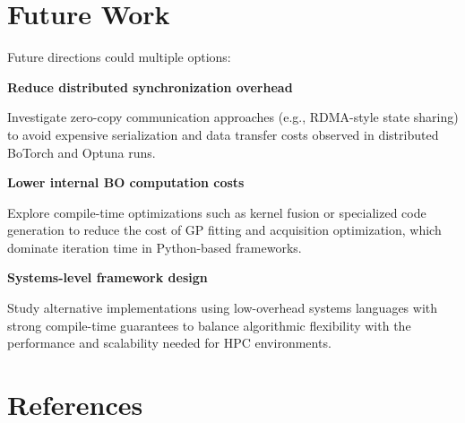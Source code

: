 \documentclass[11pt]{article}
\begin{document}
\section{Future Work}
Future directions could multiple options:


    \item \textbf{Reduce distributed synchronization overhead}

 Investigate zero-copy communication approaches (e.g., RDMA-style state sharing) to avoid expensive serialization and data transfer costs observed in distributed BoTorch and Optuna runs.
    \item \textbf{Lower internal BO computation costs}

 Explore compile-time optimizations such as kernel fusion or specialized code generation to reduce the cost of GP fitting and acquisition optimization, which dominate iteration time in Python-based frameworks.
    \item \textbf{Systems-level framework design}

 Study alternative implementations using low-overhead systems languages with strong compile-time guarantees to balance algorithmic flexibility with the performance and scalability needed for HPC environments. 

\section*{References}
\end{document}
